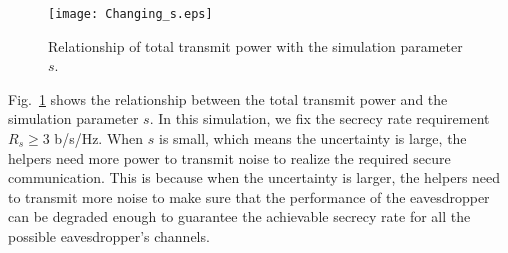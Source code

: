 \documentclass[12pt,journal,draftclsnofoot,onecolumn]{IEEEtran}
\begin{document}
\begin{figure}[!ht]
	\centering
	\texttt{[image: Changing\_s.eps]} %
	\caption{Relationship of total transmit power with the simulation parameter $s$.}
	\label{fig:Changing_s}
\end{figure}

Fig.~\ref{fig:Changing_s} shows  the relationship between the total transmit power and the simulation parameter $s$. In this simulation, we fix the secrecy rate requirement $R_s \geq 3 $ b/s/Hz. When $s$ is small, which means the uncertainty is large, the helpers need more power to transmit noise to realize the required secure communication. This is because when the uncertainty is larger, the helpers need to transmit more noise to make sure that the performance of the eavesdropper can be degraded enough to guarantee the achievable secrecy rate for all the possible eavesdropper's channels.

%
\end{document}
